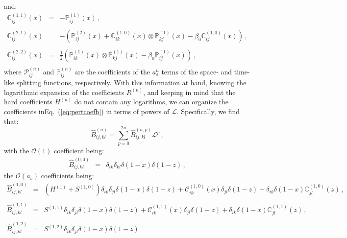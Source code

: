 \documentclass[10pt,a4paper]{article}
\begin{document}
and:
\begin{equation}
\begin{array}{rcl}
  \mathbb{C}_{ij}^{(1,1)}(x) &=& -\mathbb{P}_{ij}^{(1)}(x) \,,\\
  \\
  \mathbb{C}_{ij}^{(2,1)}(x) &=& -\left(\mathbb{P}_{ij}^{(2)}(x)+\mathbb{C}_{ik}^{(1,0)}(x)
                                  \otimes
                                  \mathbb{P}_{kj}^{(1)}(x)-\beta_0
                                  \mathbb{C}_{ij}^{(1,0)}(x) \right)\,,\\
  \\
  \mathbb{C}_{ij}^{(2,2)}(x) &=&\displaystyle
                                  \frac12\left(\mathbb{P}_{ik}^{(1)}(x)\otimes \mathbb{P}_{kj}^{(1)}(x)-\beta_0 \mathbb{P}_{ij}^{(1)}(x)\right)\,,\\
\end{array}
\end{equation}
where $\mathcal{P}_{ij}^{(n)}$ and $\mathbb{P}_{ij}^{(n)}$ are the
coefficients of the $a_s^n$ terms of the space- and time-like
splitting functions, respectively. With this information at hand,
knowing the logarithmic expansion of the coefficients $R^{(n)}$, and
keeping in mind that the hard coefficients $H^{(n)}$ do not contain
any logarithms, we can organize the coefficients
inEq.~(\ref{eq:pertcoefb}) in terms of powers of
$\mathcal{L}$. Specifically, we find that:
\begin{equation}
\hat{B}_{ij,kl}^{(n)} = \sum_{p=0}^{2n}\hat{B}_{ij,kl}^{(n,p)}\mathcal{L}^p\,,
\end{equation}
with the $\mathcal{O}(1)$ coefficient being:
\begin{equation}
\begin{array}{rcl}
  \hat{B}_{ij,kl}^{(0,0)} &=& \delta_{ik}\delta_{kl}\delta(1-x)
                              \delta(1-z)\,,
\end{array}
\end{equation}
the $\mathcal{O}(a_s)$ coefficients being:
\begin{equation}
\begin{array}{rcl}
  \hat{B}_{ij,kl}^{(1,0)} &=&\displaystyle
                              (H^{(1)}+S^{(1,0)})\delta_{ik}\delta_{jl}\delta(1-x)\delta(1-z)+ \mathcal{C}_{ik}^{(1,0)}(x)\delta_{jl}\delta(1-z) + \delta_{ik}\delta(1-x)\mathbb{C}_{jl}^{(1,0)}(z)\,,\\
  \\
  \hat{B}_{ij,kl}^{(1,1)} &=& S^{(1,1)}\delta_{ik}\delta_{jl}\delta(1-x)\delta(1-z)+ \mathcal{C}_{ik}^{(1,1)}(x)\delta_{jl}\delta(1-z) + \delta_{ik}\delta(1-x)\mathbb{C}_{jl}^{(1,1)}(z) \,,\\
  \\
  \hat{B}_{ij,kl}^{(1,2)} &=&
                              S^{(1,2)}\delta_{ik}\delta_{jl}\delta(1-x)\delta(1-z)
\end{array}
\end{equation}
\end{document}
